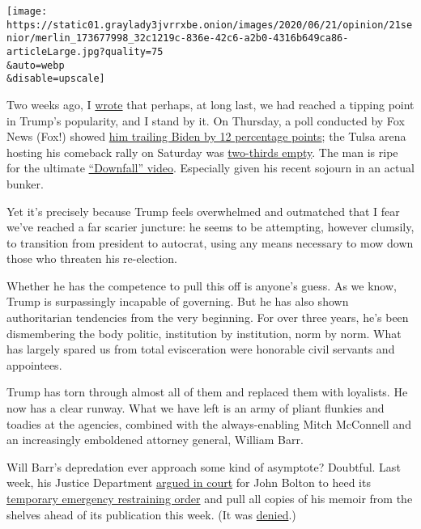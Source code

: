 \texttt{[image: https://static01.graylady3jvrrxbe.onion/images/2020/06/21/opinion/21senior/merlin\_173677998\_32c1219c-836e-42c6-a2b0-4316b649ca86-articleLarge.jpg?quality=75\\\&auto=webp\\\&disable=upscale]}

Two weeks ago, I
\href{https://www.nytimes3xbfgragh.onion/2020/06/07/opinion/trump-mattis-polls.html}{wrote}
that perhaps, at long last, we had reached a tipping point in Trump's
popularity, and I stand by it. On Thursday, a poll conducted by Fox News
(Fox!) showed
\href{https://www.politico.com/news/2020/06/18/fox-news-poll-trump-biden-329153}{him
trailing Biden by 12 percentage points}; the Tulsa arena hosting his
comeback rally on Saturday was
\href{https://www.vox.com/2020/6/21/21298177/trump-tulsa-rally-low-turnout}{two-thirds
empty}. The man is ripe for the ultimate
\href{https://knowyourmeme.com/memes/hitlers-downfall-parodies}{``Downfall''
video}. Especially given his recent sojourn in an actual bunker.

Yet it's precisely because Trump feels overwhelmed and outmatched that I
fear we've reached a far scarier juncture: he seems to be attempting,
however clumsily, to transition from president to autocrat, using any
means necessary to mow down those who threaten his re-election.

Whether he has the competence to pull this off is anyone's guess. As we
know, Trump is surpassingly incapable of governing. But he has also
shown authoritarian tendencies from the very beginning. For over three
years, he's been dismembering the body politic, institution by
institution, norm by norm. What has largely spared us from total
evisceration were honorable civil servants and appointees.

Trump has torn through almost all of them and replaced them with
loyalists. He now has a clear runway. What we have left is an army of
pliant flunkies and toadies at the agencies, combined with the
always-enabling Mitch McConnell and an increasingly emboldened attorney
general, William Barr.

Will Barr's depredation ever approach some kind of asymptote? Doubtful.
Last week, his Justice Department
\href{https://www.nytimes3xbfgragh.onion/2020/06/19/us/politics/john-bolton-book-hearing.html}{argued
in court} for John Bolton to heed its
\href{https://www.documentcloud.org/documents/6951053-Bolton-TRO.html}{temporary
emergency restraining order} and pull all copies of his memoir from the
shelves ahead of its publication this week. (It was
\href{https://www.nytimes3xbfgragh.onion/2020/06/20/us/politics/john-bolton-book-ruling.html}{denied}.)

